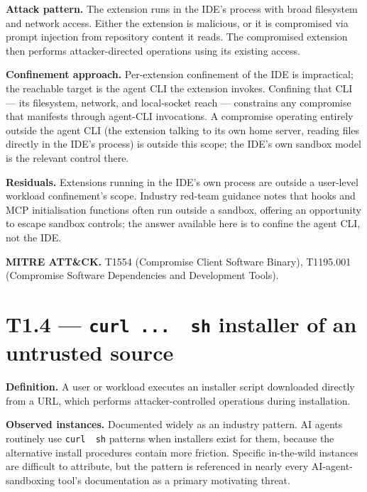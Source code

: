 \textbf{Attack pattern.} The extension runs in the IDE's process with
broad filesystem and network access. Either the extension is malicious,
or it is compromised via prompt injection from repository content it
reads. The compromised extension then performs attacker-directed
operations using its existing access.

\textbf{Confinement approach.} Per-extension confinement of the IDE is
impractical; the reachable target is the agent CLI the extension
invokes. Confining that CLI --- its filesystem, network, and
local-socket reach --- constrains any compromise that manifests through
agent-CLI invocations. A compromise operating entirely outside the agent
CLI (the extension talking to its own home server, reading files
directly in the IDE's process) is outside this scope; the IDE's own
sandbox model is the relevant control there.

\textbf{Residuals.} Extensions running in the IDE's own process are
outside a user-level workload confinement's scope. Industry red-team
guidance notes that hooks and MCP initialisation functions often run
outside a sandbox, offering an opportunity to escape sandbox controls;
the answer available here is to confine the agent CLI, not the IDE.

\textbf{MITRE ATT\&CK.} T1554 (Compromise Client Software Binary),
T1195.001 (Compromise Software Dependencies and Development Tools).

\hypertarget{t1.4-curl-...-sh-installer-of-an-untrusted-source}{%
\section{\texorpdfstring{T1.4 --- \texttt{curl\ ...\ \textbar{}\ sh}
installer of an untrusted
source}{T1.4 --- curl ... \textbar{} sh installer of an untrusted source}}\label{t1.4-curl-...-sh-installer-of-an-untrusted-source}}

\textbf{Definition.} A user or workload executes an installer script
downloaded directly from a URL, which performs attacker-controlled
operations during installation.

\textbf{Observed instances.} Documented widely as an industry pattern.
AI agents routinely use \texttt{curl\ \textbar{}\ sh} patterns when
installers exist for them, because the alternative install procedures
contain more friction. Specific in-the-wild instances are difficult to
attribute, but the pattern is referenced in nearly every
AI-agent-sandboxing tool's documentation as a primary motivating threat.

